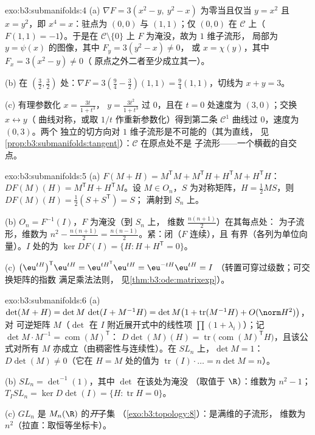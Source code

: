 \begin{solution}{exo:b3:submanifolds:4}
(a) $\nabla F = 3(x^2 - y,\ y^2 - x)$ 为零当且仅当 $y = x^2$
且 $x = y^2$，即 $x^4 = x$：驻点为 $(0,0)$ 与 $(1,1)$；仅
$(0,0)$ 在 $\mathcal C$ 上（$F(1,1) = -1$）。于是在 $\mathcal
C\setminus\{0\}$ 上 $F$ 为淹没，故为 $1$ 维子流形，
局部为 $y = \psi(x)$ 的图像，其中 $F_y = 3(y^2 - x) \neq 0$，
或 $x = \chi(y)$，其中 $F_x = 3(x^2 - y) \neq 0$（
原点之外二者至少成立其一）。

(b) 在 $(\frac32, \frac32)$ 处：$\nabla F = 3(\frac94 - \frac32)
(1, 1) = \frac94(1,1)$，切线为 $x + y = 3$。

(c) 有理参数化 $x = \frac{3t}{1 + t^3}$，
$y = \frac{3t^2}{1+t^3}$ 过 $0$，且在 $t = 0$ 处速度为
$(3, 0)$；交换 $x \leftrightarrow y$（
曲线对称，或取 $1/t$ 作重新参数化）得到第二条
$\mathcal C^1$ 曲线过 $0$，速度为 $(0, 3)$。两个
独立的切方向对
$1$ 维子流形是不可能的（其为直线，
见\cref{prop:b3:submanifolds:tangent}）：$\mathcal C$ 在原点处不是
子流形——一个横截的自交点。
\end{solution}

\begin{solution}{exo:b3:submanifolds:5}
(a) $F(M + H) = M^{\mathsf T}M + M^{\mathsf T}H + H^{\mathsf
T}M + H^{\mathsf T}H$：$DF(M)(H) = M^{\mathsf T}H +
H^{\mathsf T}M$。设 $M \in O_n$，$S$ 为对称矩阵，$H =
\frac12MS$，则 $DF(M)(H) = \frac12(S + S^{\mathsf T}) = S$；
满射到 $S_n$ 上。

(b) $O_n = F^{-1}(I)$，$F$ 为淹没（到 $S_n$ 上，
维数 $\frac{n(n+1)}2$）在其每点处：
为子流形，维数为 $n^2 - \frac{n(n+1)}2 =
\frac{n(n-1)}2$。紧：闭（$F$ 连续），且
有界（各列为单位向量）。$I$ 处的为 $\ker DF(I) =
\{H : H + H^{\mathsf T} = 0\}$。

(c) $\bigl(\eu^{tH}\bigr)^{\mathsf T}\eu^{tH} =
\eu^{tH^{\mathsf T}}\eu^{tH} = \eu^{-tH}\eu^{tH} = I$
（转置可穿过级数；可交换矩阵的指数
满足乘法法则，
见\cref{thm:b3:ode:matrixexp}）。
\end{solution}

\begin{solution}{exo:b3:submanifolds:6}
(a) $\det(M + H) = \det M\,\det(I + M^{-1}H) = \det M\bigl(1
+ \operatorname{tr}(M^{-1}H) + O(\norm H^2)\bigr)$，对
可逆矩阵 $M$（$\det$ 在 $I$ 附近展开式中的线性项
$\prod(1 + \lambda_i)$）；记 $\det M\cdot M^{-1} =
\operatorname{com}(M)^{\mathsf T}$：
$D\det(M)(H) = \operatorname{tr}\bigl(\operatorname{com}
(M)^{\mathsf T}H\bigr)$，且该公式对所有 $M$
亦成立（由稠密性与连续性）。在 $SL_n$ 上，$\det M = 1$：
$D\det(M) \ne 0$（它在 $H = M$ 处的值为
$\operatorname{tr}(I)\cdot\dots = n\det M = n$）。

(b) $SL_n = \det^{-1}(1)$，其中 $\det$ 在该处为淹没
（取值于 $\R$）：维数为 $n^2 - 1$；$T_ISL_n = \ker
D\det(I) = \{H : \operatorname{tr}H = 0\}$。

(c) $GL_n$ 是 $M_n(\R)$ 的\emph{开}子集
（\cref{exo:b3:topology:8}）：是满维的子流形，
维数为 $n^2$（拉直：取恒等坐标卡）。
\end{solution}

